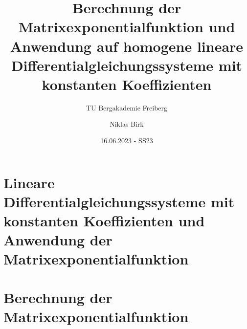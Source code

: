 \documentclass[11pt]{scrartcl}
\title{
    Berechnung der Matrixexponentialfunktion und
    Anwendung auf homogene lineare Differentialgleichungssysteme mit konstanten Koeffizienten
}
\subtitle{TU Bergakademie Freiberg}
\author{Niklas Birk}
\date{16.06.2023 - SS23}
\begin{document}
    \maketitle
    \tableofcontents

    \printbibliography


    \newpage

    \section{Lineare Differentialgleichungssysteme mit konstanten Koeffizienten und Anwendung der Matrixexponentialfunktion}\label{sec:dgls-matrixexponential}
    

    \section{Berechnung der Matrixexponentialfunktion}\label{sec:berechnung-matrixexponential}
    
\end{document}
